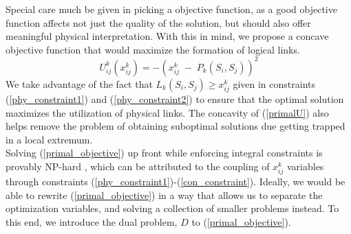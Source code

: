 \documentclass[sigconf]{acmart}
\begin{document}
Special care much be given in picking a objective function, as a good objective function affects not just the quality of the solution, but should also offer meaningful physical interpretation. With this in mind, we propose a concave objective function that would maximize the formation of logical links.
\begin{equation}\label{primalU}
U_{ij}^k(x_{ij}^k) = - (x_{ij}^k \; - \; P_k(S_i, S_j))^2
\end{equation}
We take advantage of the fact that $L_k(S_i, S_j) \geq x_{ij}^k$ given in constraints (\ref{phy_constraint1}) and (\ref{phy_constraint2}) to ensure that the optimal solution maximizes the utilization of physical links. The concavity of (\ref{primalU}) also helps remove the problem of obtaining suboptimal solutions due getting trapped in a local extremum. \\%
Solving (\ref{primal_objective}) up front while enforcing integral constraints is provably NP-hard \cite{foerster2018characterizing}, which can be attributed to the coupling of $x_{ij}^k$ variables through constraints (\ref{phy_constraint1})-(\ref{con_constraint}). Ideally, we would be able to rewrite (\ref{primal_objective}) in a way that allows us to separate the optimization variables, and solving a collection of smaller problems instead. To this end, we introduce the dual problem, $D$ to  (\ref{primal_objective}). 
\end{document}
